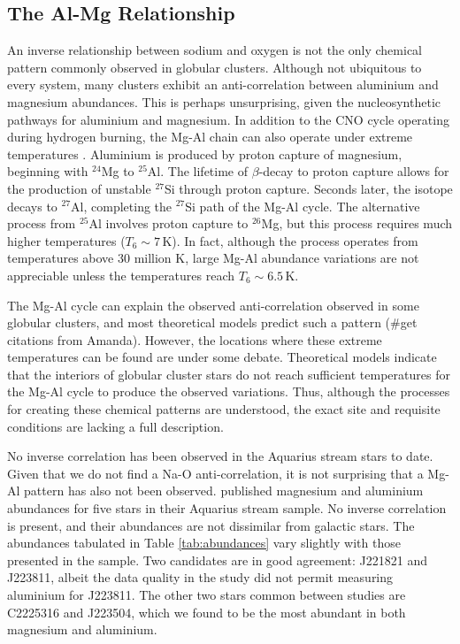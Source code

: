 \documentclass{emulateapj}
\begin{document}
\subsection{The Al-Mg Relationship}


An inverse relationship between sodium and oxygen is not the only chemical pattern commonly observed in globular clusters. Although not ubiquitous to every system, many clusters exhibit an anti-correlation between aluminium and magnesium abundances. This is perhaps unsurprising, given the nucleosynthetic pathways for aluminium and magnesium. In addition to the CNO cycle operating during hydrogen burning, the Mg-Al chain can also operate under extreme temperatures \citep[$T_6 \sim 3$\,K;][]{arnould;et-al_1999}. Aluminium is produced by proton capture of magnesium, beginning with $^{24}$Mg to $^{25}$Al. The lifetime of $\beta$-decay to proton capture allows for the production of unstable $^{27}$Si through proton capture. Seconds later, the isotope decays to $^{27}$Al, completing the $^{27}$Si path of the Mg-Al cycle. The alternative process from $^{25}$Al involves proton capture to $^{26}$Mg, but this process requires much higher temperatures ($T_6 \sim 7$\,K). In fact, although the process operates from temperatures above 30 million K, large Mg-Al abundance variations are not appreciable unless the temperatures reach $T_6 \sim 6.5$\,K. 

The Mg-Al cycle can explain the observed anti-correlation observed in some globular clusters, and most theoretical models predict such a pattern (\#get citations from Amanda). However, the locations where these extreme temperatures can be found are under some debate. Theoretical models indicate that the interiors of globular cluster stars do not reach sufficient temperatures for the Mg-Al cycle to produce the observed variations. Thus, although the processes for creating these chemical patterns are understood, the exact site and requisite conditions are lacking a full description.

No inverse correlation has been observed in the Aquarius stream stars to date. Given that we do not find a Na-O anti-correlation, it is not surprising that a Mg-Al pattern has also not been observed. \citet{wylie-de-boer;et-al_2012} published magnesium and aluminium abundances for five stars in their Aquarius stream sample. No inverse correlation is present, and their abundances are not dissimilar from galactic stars. The abundances tabulated in Table \ref{tab:abundances} vary slightly with those presented in the \citet{wylie-de-boer;et-al_2012} sample. Two candidates are in good agreement: J221821 and J223811, albeit the data quality in the \citet{wylie-de-boer;et-al_2012} study did not permit measuring aluminium for J223811. The other two stars common between studies are C2225316 and J223504, which we found to be the most abundant in both magnesium and aluminium. 
\end{document}
